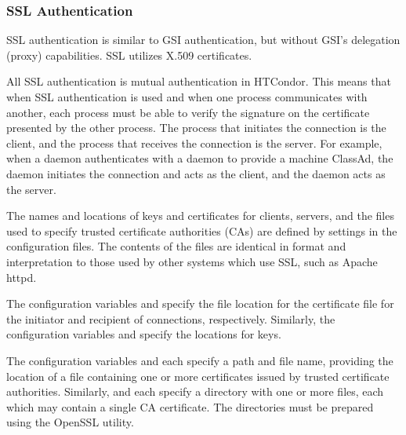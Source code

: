 \subsubsection{\label{sec:SSL-Authentication}SSL Authentication}
SSL authentication is similar to GSI authentication,
but without GSI's delegation (proxy) capabilities.
SSL utilizes X.509 certificates.

All SSL authentication is mutual authentication in HTCondor.
This means that when SSL authentication is used and when one process
communicates with another, each process must be able to verify the
signature on the certificate presented by the other process.  
The process that initiates the connection is the client,
and the process that receives the connection is the server.
For example, when a  daemon
authenticates with a  daemon
to provide a machine ClassAd,
the  daemon initiates the connection and acts as the client,
and the  daemon acts as the server.

The names and locations of keys and certificates for clients,
servers, and the files used to specify trusted certificate authorities
(CAs) are defined by settings in the configuration files.
The contents of the files are identical in format
and interpretation to those used by
other systems which use SSL, such as Apache httpd.

The configuration variables 
 and 
specify the file location
for the certificate file for the initiator and recipient of connections,
respectively.
Similarly, the configuration variables
 and 
specify the locations for keys.

The configuration variables 
 and 
each specify a path and file name, providing the location
of a file containing one or more
certificates issued by trusted certificate authorities.
Similarly,
 and 
each specify a directory with one or more files,
each which may contain a single CA certificate.  The directories
must be prepared using the OpenSSL  utility.

